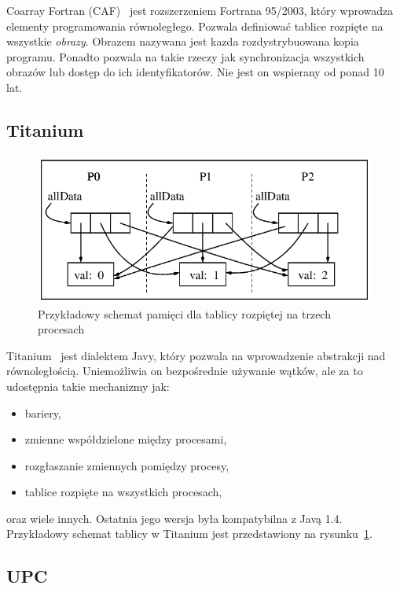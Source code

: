 \documentclass[twocolumn]{article}
\begin{document}
Coarray Fortran (CAF)~\cite{coarray_fortran} jest rozszerzeniem Fortrana 95/2003,
który wprowadza elementy programowania równoległego.
Pozwala definiować tablice rozpięte na wszystkie \textit{obrazy}.
Obrazem nazywana jest kazda rozdystrybuowana kopia programu.
Ponadto pozwala na takie rzeczy jak synchronizacja wszystkich obrazów
lub dostęp do ich identyfikatorów.
Nie jest on wspierany od ponad 10 lat.

\subsection{Titanium}

\begin{figure}
    \centering
    \includegraphics[width=\columnwidth]{titanium_memory.png}
    \caption{Przykładowy schemat pamięci dla tablicy rozpiętej na trzech procesach~\cite{titanium_docs}}
    \label{fig:titanium_memory}
\end{figure}

Titanium~\cite{titanium} jest dialektem Javy, który
pozwala na wprowadzenie abstrakcji nad równoległością.
Uniemożliwia on bezpośrednie używanie wątków, ale za to udostępnia
takie mechanizmy jak:
\begin{itemize}
    \item bariery,
    \item zmienne współdzielone między procesami,
    \item rozgłaszanie zmiennych pomiędzy procesy,
    \item tablice rozpięte na wszystkich procesach,
\end{itemize}
oraz wiele innych.
Ostatnia jego wersja była kompatybilna z Javą 1.4.
Przykładowy schemat tablicy w Titanium jest
przedstawiony na rysunku~\ref{fig:titanium_memory}.

\subsection{UPC}
\end{document}
